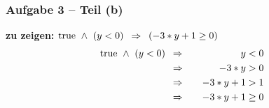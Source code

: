 \documentclass{beamer}
\begin{document}
\begin{frame} \frametitle{Aufgabe 3 -- Teil (b)}
	\begin{center}
		\textbf{zu zeigen:} $\text{true} \ \land \ (y < 0) \enskip \Rightarrow \enskip (-3 * y + 1 \ge 0)$
		\pause
		\begin{alignat*}{2}
			\text{true} \ \land \ (y < 0) \enskip &\Rightarrow \quad &y &< 0 \\
			&\Rightarrow \quad &-3 * y &> 0 \\ 
			&\Rightarrow \quad &-3 * y + 1 &> 1 \\ 
			&\Rightarrow \quad &-3 * y + 1 &\ge 0 
		\end{alignat*}
	\end{center}
\end{frame}
\end{document}
